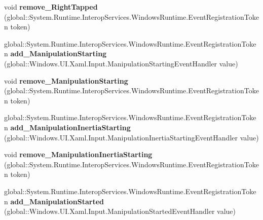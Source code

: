 \begin{DoxyCompactItemize}
void {\bfseries remove\+\_\+\+Right\+Tapped} (global\+::\+System.\+Runtime.\+Interop\+Services.\+Windows\+Runtime.\+Event\+Registration\+Token token)
\item 
\mbox{\label{interface_windows_1_1_u_i_1_1_xaml_1_1_i_u_i_element_a893f1fc019c5b01a9edcf81dbae7fb71}} 
global\+::\+System.\+Runtime.\+Interop\+Services.\+Windows\+Runtime.\+Event\+Registration\+Token {\bfseries add\+\_\+\+Manipulation\+Starting} (global\+::\+Windows.\+U\+I.\+Xaml.\+Input.\+Manipulation\+Starting\+Event\+Handler value)
\item 
\mbox{\label{interface_windows_1_1_u_i_1_1_xaml_1_1_i_u_i_element_aacad93dba45c725c051fd835e8599cc8}} 
void {\bfseries remove\+\_\+\+Manipulation\+Starting} (global\+::\+System.\+Runtime.\+Interop\+Services.\+Windows\+Runtime.\+Event\+Registration\+Token token)
\item 
\mbox{\label{interface_windows_1_1_u_i_1_1_xaml_1_1_i_u_i_element_a8b3a684ee7f64d2a3b27633301a58825}} 
global\+::\+System.\+Runtime.\+Interop\+Services.\+Windows\+Runtime.\+Event\+Registration\+Token {\bfseries add\+\_\+\+Manipulation\+Inertia\+Starting} (global\+::\+Windows.\+U\+I.\+Xaml.\+Input.\+Manipulation\+Inertia\+Starting\+Event\+Handler value)
\item 
\mbox{\label{interface_windows_1_1_u_i_1_1_xaml_1_1_i_u_i_element_a45e976afe0af013e41228cbdbdf558d2}} 
void {\bfseries remove\+\_\+\+Manipulation\+Inertia\+Starting} (global\+::\+System.\+Runtime.\+Interop\+Services.\+Windows\+Runtime.\+Event\+Registration\+Token token)
\item 
\mbox{\label{interface_windows_1_1_u_i_1_1_xaml_1_1_i_u_i_element_a0a6629935ddc66f152be79ea1665fe62}} 
global\+::\+System.\+Runtime.\+Interop\+Services.\+Windows\+Runtime.\+Event\+Registration\+Token {\bfseries add\+\_\+\+Manipulation\+Started} (global\+::\+Windows.\+U\+I.\+Xaml.\+Input.\+Manipulation\+Started\+Event\+Handler value)
\item 
\mbox{\label{interface_windows_1_1_u_i_1_1_xaml_1_1_i_u_i_element_a474a76e685a8b1af9722e5560b7d4c12}} 

\end{DoxyCompactItemize}
